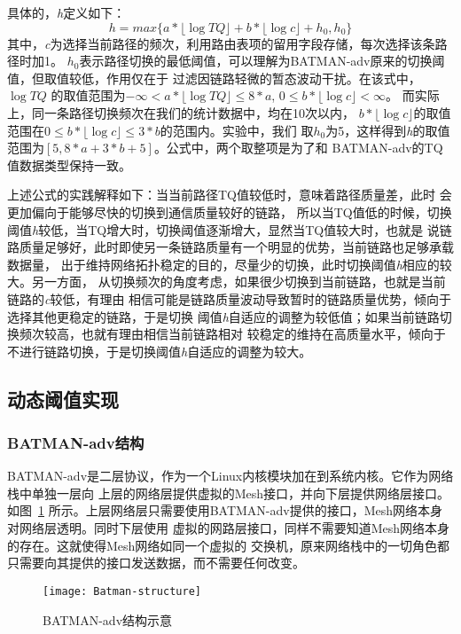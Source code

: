 具体的，\emph{h}定义如下：
\begin{equation}
\label{equ:h_threshold}
h = max\{a*\lfloor\log TQ\rfloor + b*\lfloor \log c\rfloor + h_{0}, h_{0}\}
\end{equation}
其中，\emph{c}为选择当前路径的频次，利用路由表项的留用字段存储，每次选择该条路径时加1。
$h_{0}$表示路径切换的最低阈值，可以理解为BATMAN-adv原来的切换阈值，但取值较低，作用仅在于
过滤因链路轻微的暂态波动干扰。在该式中，$\log TQ$
的取值范围为$-\infty < a*\lfloor\log TQ\rfloor \leq 8*a$,
$0 \leq b*\lfloor \log c\rfloor < \infty$。
而实际上，同一条路径切换频次在我们的统计数据中，均在10次以内，
$b*\lfloor \log c\rfloor$的取值范围在$0 \leq b*\lfloor \log c\rfloor \leq 3*b$的范围内。实验中，我们
取$h_{0}$为5，这样得到\emph{h}的取值范围为$[5, 8*a+3*b+5]$。公式中，两个取整项是为了和
BATMAN-adv的TQ值数据类型保持一致。

上述公式的实践解释如下：当当前路径TQ值较低时，意味着路径质量差，此时
会更加偏向于能够尽快的切换到通信质量较好的链路，
所以当TQ值低的时候，切换阈值\emph{h}较低，当TQ增大时，切换阈值逐渐增大，显然当TQ值较大时，也就是
说链路质量足够好，此时即使另一条链路质量有一个明显的优势，当前链路也足够承载数据量，
出于维持网络拓扑稳定的目的，尽量少的切换，此时切换阈值\emph{h}相应的较大。另一方面，
从切换频次的角度考虑，如果很少切换到当前链路，也就是当前链路的\emph{c}较低，有理由
相信可能是链路质量波动导致暂时的链路质量优势，倾向于选择其他更稳定的链路，于是切换
阈值\emph{h}自适应的调整为较低值；如果当前链路切换频次较高，也就有理由相信当前链路相对
较稳定的维持在高质量水平，倾向于不进行链路切换，于是切换阈值\emph{h}自适应的调整为较大。

\subsection{动态阈值实现}
\renewcommand{\thesubsubsection}{\Alph{subsubsection}.}
\subsubsection{BATMAN-adv结构}
BATMAN-adv是二层协议，作为一个Linux内核模块加在到系统内核。它作为网络栈中单独一层向
上层的网络层提供虚拟的Mesh接口，并向下层提供网络层接口。如图~\ref{fig:batman-structure}
所示。上层网络层只需要使用BATMAN-adv提供的接口，Mesh网络本身对网络层透明。同时下层使用
虚拟的网路层接口，同样不需要知道Mesh网络本身的存在。这就使得Mesh网络如同一个虚拟的
交换机，原来网络栈中的一切角色都只需要向其提供的接口发送数据，而不需要任何改变。
\begin{figure}[H] %
  \centering
  \texttt{[image: Batman-structure]}
  \caption{BATMAN-adv结构示意}
  \label{fig:batman-structure}
\end{figure}

